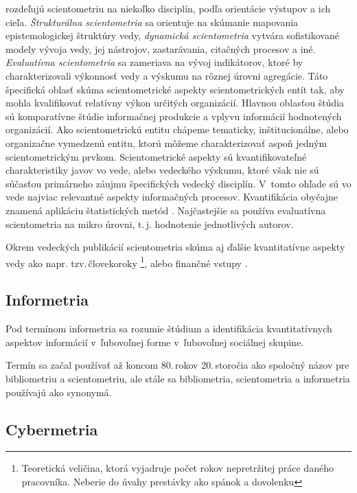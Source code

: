 \citet{Glanzel2004} rozdeľujú scientometriu na niekoľko disciplín, podľa
orientácie výstupov a ich cieľa. \emph{Štrukturálna scientometria} sa orientuje
na skúmanie mapovania epistemologickej štruktúry vedy, \emph{dynamická
scientometria} vytvára sofistikované modely vývoja vedy, jej nástrojov,
zastarávania, citačných procesov a iné. \emph{Evaluatívna scientometria} sa
zameriava na vývoj indikátorov, ktoré by charakterizovali výkonnosť vedy a
výskumu na rôznej úrovni agregácie.  Táto špecifická oblasť skúma
scientometrické aspekty scientometrických entít tak, aby mohla kvalifikovať
relatívny výkon určitých organizácií. Hlavnou oblasťou štúdia sú komparatívne štúdie
informačnej produkcie a vplyvu informácií hodnotených organizácií. Ako
scientometrickú entitu chápeme tematicky, inštitucionálne, alebo organizačne
vymedzenú entitu, ktorú môžeme charakterizovať aspoň jedným scientometrickým
prvkom. Scientometrické aspekty sú kvantifikovateľné charakteristiky javov vo
vede, alebo vedeckého výskumu, ktoré však nie sú súčasťou primárneho záujmu
špecifických vedecký disciplín. V~tomto ohľade sú vo vede najviac relevantné
aspekty informačných procesov. Kvantifikácia obyčajne znamená aplikáciu
štatistických metód \citep{Vinkler2001}.  Najčastejšie sa používa evaluatívna
scientometria na mikro úrovni, t.\,j. hodnotenie jednotlivých autorov.

Okrem vedeckých publikácií scientometria skúma aj ďalšie kvantitatívne aspekty
vedy ako napr. tzv.\,človekoroky \footnote{Teoretická veličina, ktorá vyjadruje
počet rokov nepretržitej práce daného pracovníka. Neberie do úvahy prestávky ako
spánok a dovolenku}, alebo finančné vstupy \citep{Bellis2009}.


\subsection{Informetria}

Pod termínom informetria sa rozumie štúdium a identifikácia kvantitatívnych
aspektov informácií v~ľubovoľnej forme v~ľubovoľnej sociálnej skupine.

Termín sa začal používať až koncom 80.\,rokov 20.\,storočia ako spoločný
názov pre bibliometriu a scientometriu, ale stále sa bibliometria, scientometria a
informetria používajú ako synonymá.


\subsection{Cybermetria}

